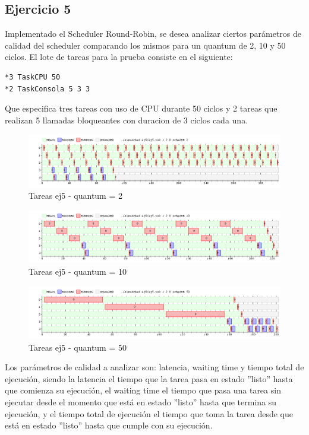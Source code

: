 \subsection{Ejercicio 5}

Implementado el Scheduler Round-Robin, se desea analizar ciertos parámetros de calidad del scheduler comparando los mismos para un quantum de 2, 10 y 50 ciclos.
El lote de tareas para la prueba consiste en el siguiente:

\begin{verbatim}
*3 TaskCPU 50 
*2 TaskConsola 5 3 3
\end{verbatim}

Que especifica tres tareas con uso de CPU durante 50 ciclos y 2 tareas que realizan 5 llamadas bloqueantes con duracion de 3 ciclos cada una.

\begin{figure}[h]
  \includegraphics[width=\textwidth]{../ej5/ej5RR1202.png}
  \caption{Tareas ej5 - quantum = 2}
\end{figure}

\begin{figure}[h]
  \includegraphics[width=\textwidth]{../ej5/ej5RR12010.png}
  \caption{Tareas ej5 - quantum = 10}
\end{figure}


\begin{figure}[h]
  \includegraphics[width=\textwidth]{../ej5/ej5RR12050.png}
  \caption{Tareas ej5 - quantum = 50}
\end{figure}

Los parámetros de calidad a analizar son: latencia, waiting time y tiempo total de ejecución, siendo la latencia el tiempo que la tarea pasa en estado ''listo'' hasta que comienza su ejecución, el waiting time el tiempo que pasa una tarea sin ejecutar desde el momento que está en estado ''listo'' hasta que termina su ejecución, y el tiempo total de ejecución el tiempo que toma la tarea desde que está en estado ''listo'' hasta que cumple con su ejecución.

